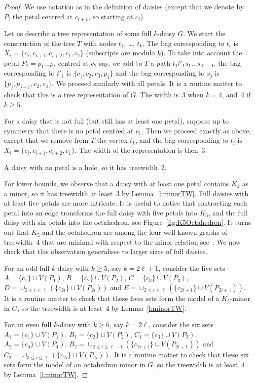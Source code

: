 \documentclass[11pt]{article}
\begin{document}
\begin{proof}
  We use notation as in the definition of daisies (except that we denote by $P_i$ the petal centred at $c_{i+1}$, so starting at $c_i$).
  
  Let us describe a tree representation of some full $k$-daisy $G$. 
  We start the construction of the tree $T$ with nodes $t_1$, \dots, $t_k$. The bag corresponding to $t_i$ is $X_i = \{c_i, c_{i+1}, c_{i+2}, c_1, c_2\}$ (subscripts are modulo $k$).  
  To take into account the petal $P_1 = p_1 \dots p_\ell$ centred at $c_{2}$ say, we add to $T$ a path $t_1 t'_1 s_1 \dots s_{\ell-1}$, the bag corresponding to $t'_1$ is $\{c_1, c_2, c_3, p_1\}$ and the bag corresponding to $s_j$ is $\{p_j, p_{j+1}, c_2, c_3\}$.  
  We proceed similarly with all petals.  It is a routine matter to check that this is a tree representation of $G$. The width is~3 when $k=4$, and~4 if $k\geq 5$.    
  
  For a daisy that is not full (but still has at least one petal), suppose up to symmetry that there is no petal centred at $c_1$.  Then we proceed exactly as above, except that we remove from $T$ the vertex $t_k$, and the bag corresponding to $t_i$ is $X_i = \{c_i, c_{i+1}, c_{i+2}, c_1\}$. The width of the representation is then~3. 

  A daisy with no petal is a hole, so it has treewidth~2.  

  For lower bounds, we observe that a daisy with at least one petal contains $K_4$ as a minor, so it has treewidth at least~3 by Lemma~\ref{l:minorTW}. 
  Full daisies with at least five petals are more intricate.  It is useful to notice that contracting each petal into an edge transforms the full daisy with five petals into $K_5$, and the full daisy with six petals into the octahedron, see Figure~\ref{fig:K5Octahedron}.  
  It turns out that $K_5$ and the octahedron are among the four well-known  graphs of treewidth~4 that are minimal with respect to the minor relation see~\cite{Arnborg1990Complexity,Satyanarayana1990LinearTime}. 
  We now check that this observation generalises to larger sizes of full daisies.   
  
  For an odd full $k$-daisy with $k\geq 5$, say $k=2\ell +1$, consider the five sets $A=\{c_1\} \cup V(P_1)$, $B=\{c_2\} \cup V(P_2)$, $C = \{c_3\} \cup V(P_3)$, $D = \cup_{2\leq i \leq \ell} (\{c_{2i}\} \cup V(P_{2i}))$ and $E = \cup_{2\leq i \leq \ell} (\{c_{2i+1}\} \cup V(P_{2i+1}))$. 
  It is a routine matter to check that these fives sets form the model of a $K_5$-minor in $G$, so the treewidth is at least~4 by Lemma~\ref{l:minorTW}. 
  
  For an even full $k$-daisy with $k\geq 6$, say $k=2\ell$, consider the six sets $A_1=\{c_1\} \cup V(P_1)$, $B_1=\{c_2\} \cup V(P_2)$, $C_1 = \{c_3\} \cup V(P_3)$, $A_2 = \{c_4\} \cup V(P_4)$, $B_2 = \cup_{2\leq i \leq \ell-1} ( \{c_{2i+1}\} \cup  V(P_{2i+1}))$ and $C_2 = \cup_{3\leq i \leq \ell} (\{c_{2i}\} \cup V(P_{2i}))$. 
  It is a routine matter to check that these six sets form the model of an octahedron minor in $G$, so the treewidth is at least~4 by Lemma~\ref{l:minorTW}. 
\end{proof}
\end{document}
